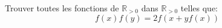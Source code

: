 \begin{exo}
Trouver toutes les fonctions de $\mathbb{R}_{>0}$ dans $\mathbb{R}_{>0}$ telles que:
$$f(x)f(y)=2f(x+yf(x))$$
\end{exo}



